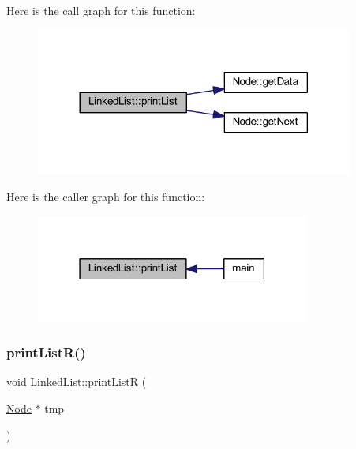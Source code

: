 Here is the call graph for this function\+:
\nopagebreak
\begin{figure}[H]
\begin{center}
\leavevmode
\includegraphics[width=296pt]{class_linked_list_ac96230938fd74a4efeb4efe8c995ee53_cgraph}
\end{center}
\end{figure}
Here is the caller graph for this function\+:
\nopagebreak
\begin{figure}[H]
\begin{center}
\leavevmode
\includegraphics[width=255pt]{class_linked_list_ac96230938fd74a4efeb4efe8c995ee53_icgraph}
\end{center}
\end{figure}
\mbox{\label{class_linked_list_a2d03b30bf762af404a7a687aceff7123}} 
\subsubsection{\texorpdfstring{print\+List\+R()}{printListR()}}
{\footnotesize\ttfamily void Linked\+List\+::print\+ListR (\begin{DoxyParamCaption}\item[{\hyperlink{class_node}{Node} $\ast$}]{tmp }\end{DoxyParamCaption})}

